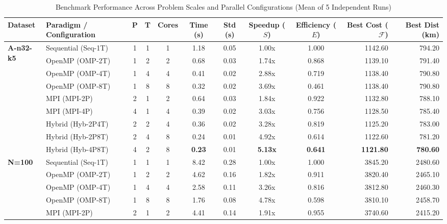 \documentclass[conference]{IEEEtran}
\begin{document}
\begin{table}[t]
\centering
\caption{Benchmark Performance Across Problem Scales and Parallel Configurations (Mean of 5 Independent Runs)}
\label{tab:full_results}
\setlength{\tabcolsep}{5pt}
\begin{adjustbox}{width=\textwidth,center}
\begin{tabular}{llcccccccrr}
\toprule
\textbf{Dataset} & \textbf{Paradigm / Configuration} & \textbf{P} & \textbf{T} & \textbf{Cores} & \textbf{Time (s)} & \textbf{Std (s)} & \textbf{Speedup ($S$)} & \textbf{Efficiency ($E$)} & \textbf{Best Cost ($\mathcal{F}$)} & \textbf{Best Dist (km)} \\
\midrule
\multirow{9}{*}{\textbf{A-n32-k5}} 
 & Sequential (Seq-1T)  & 1 & 1 & 1 & 1.18 & 0.05 & 1.00x & 1.000 & 1142.60 & 794.20 \\
 & OpenMP (OMP-2T)      & 1 & 2 & 2 & 0.68 & 0.03 & 1.74x & 0.868 & 1139.10 & 791.40 \\
 & OpenMP (OMP-4T)      & 1 & 4 & 4 & 0.41 & 0.02 & 2.88x & 0.719 & 1138.40 & 790.80 \\
 & OpenMP (OMP-8T)      & 1 & 8 & 8 & 0.32 & 0.02 & 3.69x & 0.461 & 1138.40 & 790.80 \\
 & MPI (MPI-2P)         & 2 & 1 & 2 & 0.64 & 0.03 & 1.84x & 0.922 & 1132.80 & 788.10 \\
 & MPI (MPI-4P)         & 4 & 1 & 4 & 0.39 & 0.02 & 3.03x & 0.756 & 1128.50 & 785.40 \\
 & Hybrid (Hyb-2P4T)    & 2 & 2 & 4 & 0.36 & 0.02 & 3.28x & 0.819 & 1125.20 & 783.00 \\
 & Hybrid (Hyb-2P8T)    & 2 & 4 & 8 & 0.24 & 0.01 & 4.92x & 0.614 & 1122.60 & 781.20 \\
 & Hybrid (Hyb-4P8T)    & 4 & 2 & 8 & \textbf{0.23} & 0.01 & \textbf{5.13x} & \textbf{0.641} & \textbf{1121.80} & \textbf{780.60} \\
\midrule
\multirow{9}{*}{\textbf{N=100}} 
 & Sequential (Seq-1T)  & 1 & 1 & 1 & 8.42 & 0.28 & 1.00x & 1.000 & 3845.20 & 2480.60 \\
 & OpenMP (OMP-2T)      & 1 & 2 & 2 & 4.62 & 0.16 & 1.82x & 0.911 & 3820.40 & 2465.10 \\
 & OpenMP (OMP-4T)      & 1 & 4 & 4 & 2.58 & 0.11 & 3.26x & 0.816 & 3812.80 & 2460.30 \\
 & OpenMP (OMP-8T)      & 1 & 8 & 8 & 1.76 & 0.08 & 4.78x & 0.598 & 3810.10 & 2458.70 \\
 & MPI (MPI-2P)         & 2 & 1 & 2 & 4.41 & 0.14 & 1.91x & 0.955 & 3740.60 & 2415.20 \\

\end{tabular}
\end{adjustbox}
\end{table}
\end{document}
